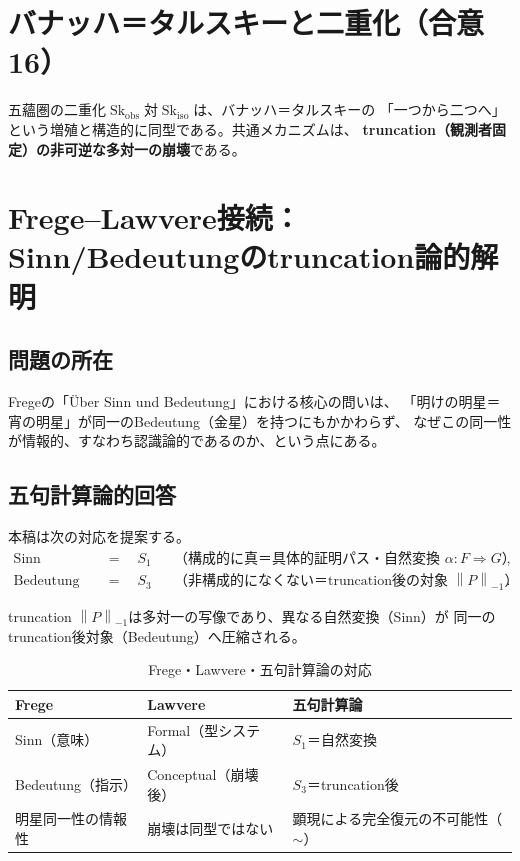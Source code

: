 \documentclass[11pt,a4paper]{ltjsarticle}
\theoremstyle{remark}
\newcommand{\trunc}[1]{\left\lVert #1\right\rVert_{-1}}
\newcommand{\Skobs}{\mathop{\mathrm{Sk}}_{\mathrm{obs}}}
\newcommand{\Skiso}{\mathop{\mathrm{Sk}}_{\mathrm{iso}}}
\begin{document}
\section{バナッハ＝タルスキーと二重化（合意16）}

五蘊圏の二重化$\Skobs$対$\Skiso$は、バナッハ＝タルスキーの
「一つから二つへ」という増殖と構造的に同型である。共通メカニズムは、
\textbf{truncation（観測者固定）の非可逆な多対一の崩壊}である。

\section{Frege--Lawvere接続：Sinn/Bedeutungのtruncation論的解明}
\label{sec:frege-lawvere}

\subsection{問題の所在}

Fregeの「Über Sinn und Bedeutung」\cite{Frege1892}における核心の問いは、
「明けの明星＝宵の明星」が同一のBedeutung（金星）を持つにもかかわらず、
なぜこの同一性が情報的、すなわち認識論的であるのか、という点にある。

\subsection{五句計算論的回答}

本稿は次の対応を提案する。
\begin{align*}
 \mathrm{Sinn}
   &\quad=\quad S_1
   &&\text{（構成的に真＝具体的証明パス・自然変換 $\alpha:F\Rightarrow G$）},\\
 \mathrm{Bedeutung}
   &\quad=\quad S_3
   &&\text{（非構成的になくない＝truncation後の対象 $\trunc{P}$）}.
\end{align*}

truncation $\trunc{P}$は多対一の写像であり、異なる自然変換（Sinn）が
同一のtruncation後対象（Bedeutung）へ圧縮される。

\begin{table}[htbp]
\centering
\caption{Frege・Lawvere・五句計算論の対応}
\label{tab:frege-lawvere}
\small
\begin{tabularx}{\textwidth}{@{}>{\raggedright\arraybackslash}X >{\raggedright\arraybackslash}X >{\raggedright\arraybackslash}X@{}}
\toprule
Frege & Lawvere & 五句計算論 \\
\midrule
Sinn（意味） & Formal（型システム） & $S_1$＝自然変換 \\
Bedeutung（指示） & Conceptual（崩壊後） & $S_3$＝truncation後 \\
明星同一性の情報性 & 崩壊は同型ではない & 顕現による完全復元の不可能性（$\sim$） \\
\bottomrule
\end{tabularx}
\end{table}
\end{document}
